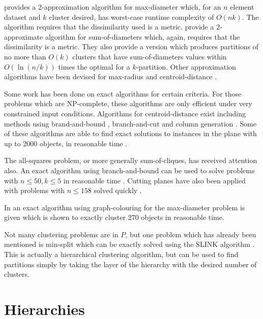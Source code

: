 \documentclass[a4paper]{report}
\begin{document}
\citet{gonzalez1985clustering} provides a 2-approximation algorithm for
max-diameter which, for an $n$ element dataset and $k$ cluster desired, has
worst-case runtime complexity of $O(nk)$.  The algorithm requires that the
dissimilarity used is a metric.  \citet{doddi2000approximation} provide a
2-approximate algorithm for sum-of-diameters which, again, requires that the
dissimilarity is a metric.  They also provide a version which produces
partitions of no more than $O(k)$ clusters that have sum-of-diameters values
within $O(\ln(n/k))$ times the optimal for a $k$-partition.  Other
approximation algorithms have been devised for max-radius
\citep{wirth04approx} and centroid-distance \citep{cormode2008approximation}.

Some work has been done on exact algorithms for certain criteria.  For those
problems which are NP-complete, these algorithms are only efficient under very
constrained input conditions.  Algorithms for centroid-distance exist
including methods using brand-and-bound \citep{brusco2006repetitive},
branch-and-cut \citep{aloise09exact} and column generation
\citep{merle1999interior}.  Some of these algorithms are able to find exact
solutions to instances in the plane with up to 2000 objects, in reasonable
time \citep{aloise09exact}.

The all-squares problem, or more generally sum-of-cliques, has received
attention also.  An exact algorithm using branch-and-bound
\citep{klein1991optimal} can be used to solve problems with $n \leq 50, k \leq
5$ in reasonable time \citep{hansen1997mathprog}.  Cutting planes have also
been applied with problems with $n \leq 158$ solved quickly
\citep{hansen1997mathprog,palubeckis1997branch}.

In \citet{hansen1978complete} an exact algorithm using graph-colouring for the
max-diameter problem is given which is shown to exactly cluster 270 objects in
reasonable time.

Not many clustering problems are in $P$, but one problem which has already
been mentioned is min-split which can be exactly solved using the SLINK
algorithm \citep{johnson67hierarchical,sibson1973slink}.  This is actually a
hierarchical clustering algorithm, but can be used to find partitions simply
by taking the layer of the hierarchy with the desired number of clusters.

\section{Hierarchies}
\label{sec:hierarchies}
\end{document}

